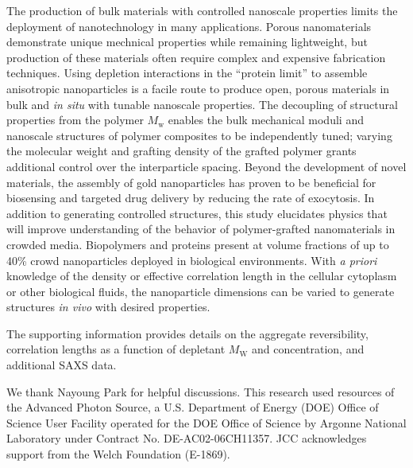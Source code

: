 \documentclass[journal=jacsat, superscriptaddress]{achemso}
\def\EDITS#1{{\color{black}#1}}
\def\EDITS#1{#1}
\def\EDITSJCC#1{{\color{black}#1}}
\def\EDITSJCC#1{#1}
\begin{document}
The production of bulk materials with controlled nanoscale properties limits the deployment of nanotechnology in many applications. \EDITS{Porous nanomaterials demonstrate unique mechnical properties while remaining lightweight,\cite{Meza2014} but production of these materials often require complex and expensive fabrication techniques.} Using depletion interactions in the ``protein limit'' to assemble anisotropic nanoparticles is a facile route to produce open, porous materials \EDITSJCC{in bulk and} \emph{in situ} with tunable nanoscale properties. The decoupling of structural properties from the polymer $M_\mathrm{w}$ enables the bulk mechanical moduli and nanoscale structures of polymer composites to be independently tuned; varying the molecular weight and grafting density of the grafted polymer grants additional control over the interparticle spacing. Beyond the development of novel materials, the assembly of gold nanoparticles has proven to be beneficial for \EDITS{biosensing\cite{Cao2014}} and targeted drug delivery by reducing the rate of exocytosis.\cite{Nam2009} \EDITS{In addition to generating controlled structures, this study elucidates physics that will \EDITSJCC{improve understanding of the behavior of} polymer-grafted nanomaterials in crowded media.} Biopolymers and proteins present at volume fractions of up to 40\% crowd nanoparticles deployed in biological environments. With \emph{a priori} knowledge of the density or effective correlation length in the cellular cytoplasm or other biological fluids, the nanoparticle dimensions can be varied to generate structures \emph{in vivo} with desired properties.  

\begin{suppinfo}
The supporting information provides details on the \EDITS{aggregate reversibility, correlation lengths as a function of depletant $M_\mathrm{W}$ and concentration, and additional SAXS data.}\end{suppinfo}

\begin{acknowledgement}
We thank Nayoung Park for helpful discussions. This research used resources of the Advanced Photon Source, a U.S. Department of Energy (DOE) Office of Science User Facility operated for the DOE Office of Science by Argonne National Laboratory under Contract No. DE-AC02-06CH11357. JCC acknowledges support from the Welch Foundation (E-1869).

\end{acknowledgement}


\end{document}
